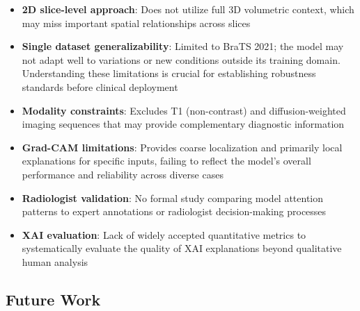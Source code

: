 \begin{itemize}
    \item \textbf{2D slice-level approach}: Does not utilize full 3D volumetric context, which may miss important spatial relationships across slices
    \item \textbf{Single dataset generalizability}: Limited to BraTS 2021; the model may not adapt well to variations or new conditions outside its training domain. Understanding these limitations is crucial for establishing robustness standards before clinical deployment
    \item \textbf{Modality constraints}: Excludes T1 (non-contrast) and diffusion-weighted imaging sequences that may provide complementary diagnostic information
    \item \textbf{Grad-CAM limitations}: Provides coarse localization and primarily local explanations for specific inputs, failing to reflect the model's overall performance and reliability across diverse cases
    \item \textbf{Radiologist validation}: No formal study comparing model attention patterns to expert annotations or radiologist decision-making processes
    \item \textbf{XAI evaluation}: Lack of widely accepted quantitative metrics to systematically evaluate the quality of XAI explanations beyond qualitative human analysis
\end{itemize}

\subsection{Future Work}

